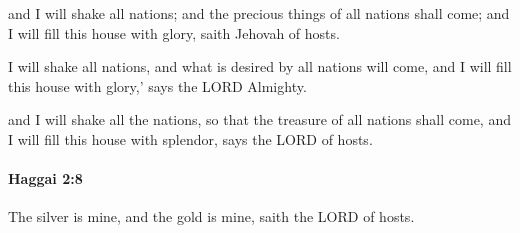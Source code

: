 			\begin{versebox}
					\item[BHS] 
					\item[LXX] 
					\item[ASV] and I will shake all nations; and the precious things of all nations shall come; and I will fill this house with glory, saith Jehovah of hosts.
					\item[NIV] I will shake all nations, and what is desired by all nations will come, and I will fill this house with glory,’ says the LORD Almighty.
					\item[NRSV] and I will shake all the nations, so that the treasure of all nations shall come, and I will fill this house with splendor, says the LORD of hosts.
			\end{versebox}

		\paragraph{Haggai 2:8} %
			\label{HAGGAI-2-8}

			The silver is mine, and the gold is mine, saith the LORD of hosts.


